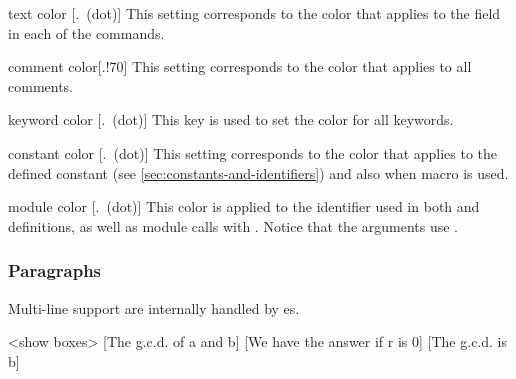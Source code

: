 \documentclass[a4paper, 11pt]{article}
\begin{document}
\begin{option}{text color}{}
    [.\mbox{\normalfont\normalcolor\normalsize~(dot)}]
    This setting corresponds to the color that applies to the  field in each of the commands.
\end{option}

\begin{option}{comment color}{}[.!70]
    This setting corresponds to the color that applies to all comments.
\end{option}

\begin{option}{keyword color}{}
    [.\mbox{\normalfont\normalcolor\normalsize~(dot)}]
    This key is used to set the color for all keywords.
\end{option}

\begin{option}{constant color}{}
    [.\mbox{\normalfont\normalcolor\normalsize~(dot)}]
    This setting corresponds to the color that applies to the defined constant (see \cref{sec:constants-and-identifiers}) and also when macro  is used.
\end{option}

\begin{option}{module color}{}
    [.\mbox{\normalfont\normalcolor\normalsize~(dot)}]
    This color is applied to the identifier used in both  and  definitions, as well as module calls with . Notice that the arguments use .
\end{option}

\subsubsection{Paragraphs}
Multi-line support are internally handled by es.

\medskip
\begingroup
\begin{algorithmic}<show boxes>
    [The g.c.d. of a and b]
        [We have the answer if r is 0]
        \EndWhile
        [The g.c.d. is b]
    \EndProcedure
\end{algorithmic}
\endgroup
\end{document}
